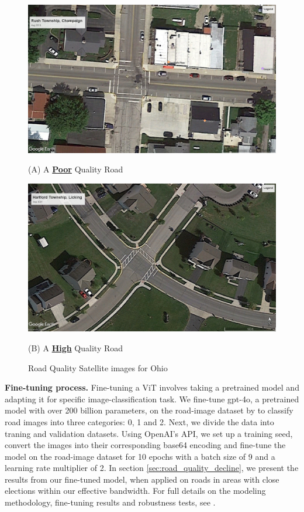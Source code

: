 \begin{figure}[ht]
    \centering
    \begin{minipage}{0.59\textwidth}
        \centering
        \includegraphics[width=\textwidth]{images/rush_twp_champaign_aug16.jpg}
        \caption*{(A) A {\bf \underline{Poor}} Quality Road}
    \end{minipage}
    \hspace{0.5in}
    \begin{minipage}{0.59\textwidth}
        \centering
        \includegraphics[width=\textwidth]{images/hartford_twp_licking_sep21.jpg}
        \caption*{(B) A {\bf \underline{High}} Quality Road}
    \end{minipage}
    \caption{Road Quality Satellite images for Ohio}
    \label{fig:road_quality_examples}
\end{figure}

{\bf Fine-tuning process.} Fine-tuning a ViT involves taking a pretrained model and adapting it for specific image-classification task. We fine-tune gpt-4o, a pretrained model with over 200 billion parameters, on the road-image dataset by \cite{brewer2021} to classify road images into three categories: 0, 1 and 2. Next, we divide the data into traning and validation datasets. Using OpenAI's API, we set up a training seed, convert the images into their corresponding base64 encoding and fine-tune the model on the road-image dataset for 10 epochs with a batch size of 9 and a learning rate multiplier of 2. In section \ref{sec:road_quality_decline}, we present the results from our fine-tuned model, when applied on roads in areas with close elections within our effective bandwidth. For full details on the modeling methodology, fine-tuning results and robustness tests, see \cite{2025predicting}. 


